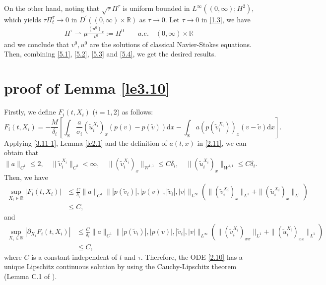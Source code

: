 \documentclass[10pt,reqno]{amsart}
\numberwithin{equation}{section}
\newcommand{\dif}{\mathrm{d}}
\begin{document}
On the other hand, noting that $\sqrt{\tau}\Pi^{\tau}$ is uniform bounded in $L^{\infty}((0,\infty);H^2)$, which yields $\tau \Pi_t ^{\tau}\rightarrow0$ in $D^{\prime}((0,\infty)\times \mathbb R)$ as $\tau\rightarrow0$.  Let $\tau\rightarrow0$ in \eqref{1.3},  we have
\begin{align}\label{5.4}
\Pi^{\tau}\rightharpoonup\mu\frac{(u^0)_x}{v^0}:=\Pi^0\qquad a.e. \quad (0,\infty)\times\mathbb{R}
\end{align}
and we conclude that $v^0,u^0$ are the solutions of classical Navier-Stokes equations.
Then, combining \eqref{5.1}, \eqref{5.2}, \eqref{5.3} and \eqref{5.4}, we get the desired results.

\appendix
\section{proof of Lemma \ref{le3.10}}


Firstly, we define $F_i(t, X_i)$ ($i=1, 2$) as follows:
\[
F_i(t, X_i)=-\frac{M}{\delta_i}
\left[\int_{\mathbb{R}}\frac{a}{\sigma_i}(\widetilde{u}_i^{X_i})_x(p(v)-p(\widetilde{v}))\dif x
-\int_{\mathbb{R}}a\left(p(\widetilde{v}_i^{X_i})\right)_x(v-\widetilde{v})\dif x\right].
\]
Applying \eqref{3.11-1}, Lemma \ref{le2.1} and the definition of $a(t, x)$ in \eqref{2.11}, we can obtain that
\[
\|a\|_{C^1}\le 2,\quad \|\widetilde{v}_i^{X_i}\|_{C^2}<\infty,\quad  \|(\widetilde{v}_i^{X_i})_x\|_{W^{1,1}}\le C\delta_i,\quad \|(\widetilde{u}_i^{X_i})_x\|_{W^{1,1}}\le C\delta_i.
\]
Then, we have
\begin{equation}\label{3.12-1}
\begin{aligned}
\sup\limits_{X_i\in\mathbb{R}}|F_i(t, X_i)|&\le \frac{C}{\delta_i}\|a\|_{C^1}\||p(\widetilde{v}_i)|,|p(v)|,|\widetilde{v}_i|,|v|\|_{L^\infty}
\left(\|(\widetilde{v}_i^{X_i})_x\|_{L^1}+\|(\widetilde{u}_i^{X_i})_x\|_{L^1}\right)\\
&\le C,
\end{aligned}
\end{equation}
and
\[
\begin{aligned}
\sup\limits_{X_i\in\mathbb{R}}|\partial_{X_i}F_i(t, X_i)|&\le \frac{C}{\delta_i}\|a\|_{C^1}\||p(\widetilde{v}_i)|,|p(v)|,|\widetilde{v}_i|,|v|\|_{L^\infty}
\left(\|(\widetilde{v}_i^{X_i})_{xx}\|_{L^1}+\|(\widetilde{u}_i^{X_i})_{xx}\|_{L^1}\right)\\
&\le C,
\end{aligned}
\]
where $C$ is a constant independent of $t$ and $\tau$. Therefore, the ODE \eqref{2.10} has a unique Lipschitz continuous solution by using the Cauchy-Lipschitz theorem (Lemma C.1 of \cite{KV9}).
\end{document}
